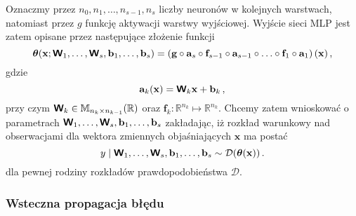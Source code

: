 \documentclass{myclass}
\begin{document}
Oznaczmy przez \(n_0, n_1, \ldots, n_{s-1}, n_s\) liczby neuronów w kolejnych warstwach, natomiast
przez \(g\) funkcję aktywacji warstwy wyjściowej. Wyjście sieci MLP jest zatem opisane przez
następujące złożenie funkcji
\begin{equation*}
    \boldsymbol{\theta}(\mathbf{x}; \boldsymbol{\mathsf{W}}_1, \ldots,\boldsymbol{\mathsf{W}}_s, \mathbf{b}_1, \ldots, \mathbf{b}_s) = \left(\mathbf{g}\circ\mathbf{a}_s\circ \mathbf{f}_{s-1}\circ\mathbf{a}_{s-1}\circ\ldots\circ \mathbf{f}_1\circ\mathbf{a}_1\right)(\mathbf{x})\,,
\end{equation*}
gdzie 
\begin{equation*}
    \mathbf{a}_k(\mathbf{x}) = \boldsymbol{\mathsf{W}}_k\mathbf{x} + \mathbf{b}_k\,,
\end{equation*}
przy czym \(\boldsymbol{\mathsf{W}}_k \in \mathbb{M}_{n_k \times n_{k-1}}(\mathbb{R})\) oraz
\(\mathbf{f}_k:\mathbb{R}^{n_k} \mapsto \mathbb{R}^{n_k}\). Chcemy zatem wnioskować o parametrach
\(\boldsymbol{\mathsf{W}}_1, \ldots,\boldsymbol{\mathsf{W}}_s, \mathbf{b}_1, \ldots, \mathbf{b}_s\) zakładając, iż rozkład
warunkowy nad obserwacjami dla wektora zmiennych objaśniających \(\mathbf {x}\) ma postać 
\begin{equation*}
    y \mid \boldsymbol{\mathsf{W}}_1, \ldots,\boldsymbol{\mathsf{W}}_s, \mathbf{b}_1, \ldots, \mathbf{b}_s \sim \mathcal{D}(\boldsymbol{\theta}(\mathbf{x}))\,.
\end{equation*}
dla pewnej rodziny rozkładów prawdopodobieństwa \(\mathcal{D}\). 

\subsubsection{Wsteczna propagacja błędu}
\end{document}
